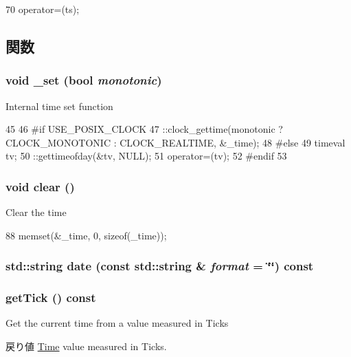 \begin{DoxyCode}
70 { operator=(ts); }
\end{DoxyCode}


\subsection{関数}
\hypertarget{classTime_a6f54fb7317f085502129d0ddab987526}{
\subsubsection[{\_\-set}]{\setlength{\rightskip}{0pt plus 5cm}void \_\-set (bool {\em monotonic})}}
\label{classTime_a6f54fb7317f085502129d0ddab987526}
Internal time set function 


\begin{DoxyCode}
45 {
46 #if USE_POSIX_CLOCK
47     ::clock_gettime(monotonic ? CLOCK_MONOTONIC : CLOCK_REALTIME, &_time);
48 #else
49     timeval tv;
50     ::gettimeofday(&tv, NULL);
51     operator=(tv);
52 #endif
53 }
\end{DoxyCode}
\hypertarget{classTime_ac8bb3912a3ce86b15842e79d0b421204}{
\subsubsection[{clear}]{\setlength{\rightskip}{0pt plus 5cm}void clear ()}}
\label{classTime_ac8bb3912a3ce86b15842e79d0b421204}
Clear the time 


\begin{DoxyCode}
88 { memset(&_time, 0, sizeof(_time)); }
\end{DoxyCode}
\hypertarget{classTime_a5cda3e393670b2c214e69d679bab0443}{
\subsubsection[{date}]{\setlength{\rightskip}{0pt plus 5cm}std::string date (const std::string \& {\em format} = {\ttfamily \char`\"{}\char`\"{}}) const}}
\label{classTime_a5cda3e393670b2c214e69d679bab0443}
\hypertarget{classTime_a972aab5d67a4da04633746972803d5d6}{
\subsubsection[{getTick}]{ getTick () const}}
\label{classTime_a972aab5d67a4da04633746972803d5d6}
Get the current time from a value measured in Ticks \begin{DoxyReturn}{戻り値}
\hyperlink{classTime}{Time} value measured in Ticks. 
\end{DoxyReturn}



